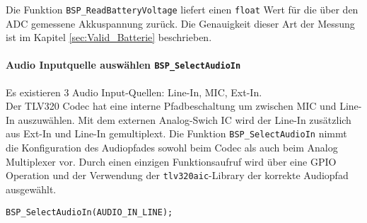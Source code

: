 Die Funktion \texttt{BSP\_ReadBatteryVoltage} liefert einen \texttt{float} Wert für die über den ADC gemessene Akkuspannung zurück. 
Die Genauigkeit dieser Art der Messung ist im Kapitel \ref{sec:Valid_Batterie} beschrieben.


\paragraph{Audio Inputquelle auswählen \texttt{BSP\_SelectAudioIn}}

Es existieren 3 Audio Input-Quellen: Line-In, MIC, Ext-In.\\
Der TLV320 Codec hat eine interne Pfadbeschaltung um zwischen MIC und Line-In auszuwählen.
Mit dem externen Analog-Swich IC wird der Line-In zusätzlich aus Ext-In und Line-In gemultiplext.
Die Funktion \texttt{BSP\_SelectAudioIn} nimmt die Konfiguration des Audiopfades sowohl  beim Codec als auch beim Analog Multiplexer vor.
Durch einen einzigen Funktionsaufruf wird über eine GPIO Operation und der Verwendung der \texttt{tlv320aic}-Library der korrekte Audiopfad ausgewählt.

\begin{lstlisting}[style=Cuvision,caption={Audiopfad Input auf Line-In setzen.}]
BSP_SelectAudioIn(AUDIO_IN_LINE);
\end{lstlisting}



